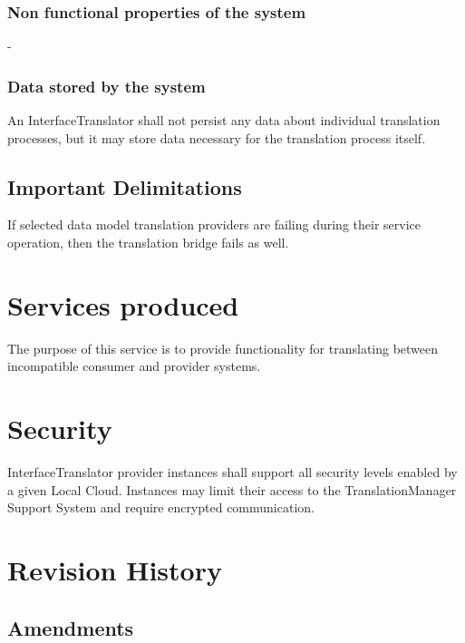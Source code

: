 \documentclass[a4paper]{arrowhead}
\begin{document}
\subsubsection {Non functional properties of the system}
-

\subsubsection {Data stored by the system}

An InterfaceTranslator shall not persist any data about individual translation processes, but it may store data necessary for the translation process itself.

\subsection{Important Delimitations}
\label{sec:delimitations}

If selected data model translation providers are failing during their service operation, then the translation bridge fails as well.

\section{Services produced}
\label{sec:services}

{}

The purpose of this service is to provide functionality for translating between incompatible consumer and provider systems.

\section{Security}
\label{sec:security}

InterfaceTranslator provider instances shall support all security levels enabled by a given Local Cloud.
Instances may limit their access to the TranslationManager Support System and require encrypted communication.

\newpage




\newpage

\section{Revision History}
\subsection{Amendments}
\end{document}
